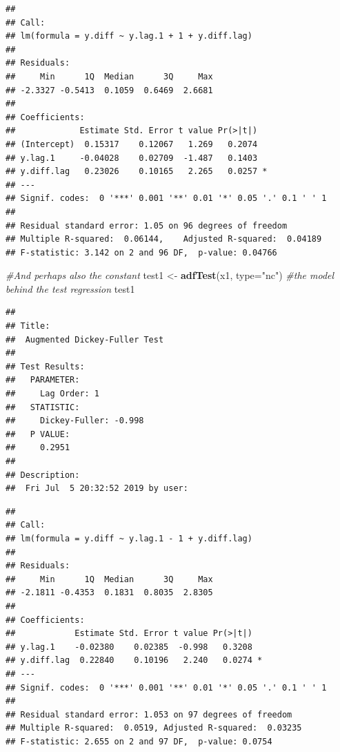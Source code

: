 \documentclass[]{book}
\newenvironment{Shaded}{\begin{snugshade}}{\end{snugshade}}
\newcommand{\CommentTok}[1]{\textcolor[rgb]{0.56,0.35,0.01}{\textit{#1}}}
\newcommand{\DataTypeTok}[1]{\textcolor[rgb]{0.13,0.29,0.53}{#1}}
\newcommand{\KeywordTok}[1]{\textcolor[rgb]{0.13,0.29,0.53}{\textbf{#1}}}
\newcommand{\NormalTok}[1]{#1}
\newcommand{\OperatorTok}[1]{\textcolor[rgb]{0.81,0.36,0.00}{\textbf{#1}}}
\newcommand{\StringTok}[1]{\textcolor[rgb]{0.31,0.60,0.02}{#1}}
\begin{document}
\begin{verbatim}
## 
## Call:
## lm(formula = y.diff ~ y.lag.1 + 1 + y.diff.lag)
## 
## Residuals:
##     Min      1Q  Median      3Q     Max 
## -2.3327 -0.5413  0.1059  0.6469  2.6681 
## 
## Coefficients:
##             Estimate Std. Error t value Pr(>|t|)  
## (Intercept)  0.15317    0.12067   1.269   0.2074  
## y.lag.1     -0.04028    0.02709  -1.487   0.1403  
## y.diff.lag   0.23026    0.10165   2.265   0.0257 *
## ---
## Signif. codes:  0 '***' 0.001 '**' 0.01 '*' 0.05 '.' 0.1 ' ' 1
## 
## Residual standard error: 1.05 on 96 degrees of freedom
## Multiple R-squared:  0.06144,    Adjusted R-squared:  0.04189 
## F-statistic: 3.142 on 2 and 96 DF,  p-value: 0.04766
\end{verbatim}

\begin{Shaded}
\begin{Highlighting}[]
\CommentTok{#And perhaps also the constant}
\NormalTok{test1 <-}\StringTok{ }\KeywordTok{adfTest}\NormalTok{(x1, }\DataTypeTok{type=}\StringTok{"nc"}\NormalTok{)}
\CommentTok{#the model behind the test regression}
\NormalTok{test1}
\end{Highlighting}
\end{Shaded}

\begin{verbatim}
## 
## Title:
##  Augmented Dickey-Fuller Test
## 
## Test Results:
##   PARAMETER:
##     Lag Order: 1
##   STATISTIC:
##     Dickey-Fuller: -0.998
##   P VALUE:
##     0.2951 
## 
## Description:
##  Fri Jul  5 20:32:52 2019 by user:
\end{verbatim}

\begin{Shaded}
\end{Shaded}

\begin{verbatim}
## 
## Call:
## lm(formula = y.diff ~ y.lag.1 - 1 + y.diff.lag)
## 
## Residuals:
##     Min      1Q  Median      3Q     Max 
## -2.1811 -0.4353  0.1831  0.8035  2.8305 
## 
## Coefficients:
##            Estimate Std. Error t value Pr(>|t|)  
## y.lag.1    -0.02380    0.02385  -0.998   0.3208  
## y.diff.lag  0.22840    0.10196   2.240   0.0274 *
## ---
## Signif. codes:  0 '***' 0.001 '**' 0.01 '*' 0.05 '.' 0.1 ' ' 1
## 
## Residual standard error: 1.053 on 97 degrees of freedom
## Multiple R-squared:  0.0519, Adjusted R-squared:  0.03235 
## F-statistic: 2.655 on 2 and 97 DF,  p-value: 0.0754
\end{verbatim}
\end{document}
